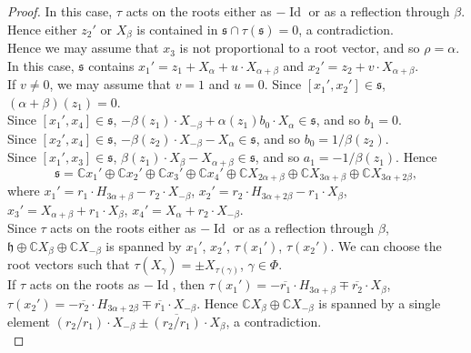 \documentclass[10pt]{article}
\begin{document}
\begin{proof}
In this case, $\tau$ acts on the roots either as $-\operatorname{Id}$ or as a reflection through $\beta$. Hence either $z_2'$ or $X_{\beta}$ is contained in $\mathfrak{s}\cap \tau (\mathfrak{s})=0$, a contradiction.\\

Hence we may assume that $x_3$ is not proportional to a root vector, and so $\rho = \alpha$. In this case, $\mathfrak{s}$ contains $x_1'=z_1+X_{\alpha}+u\cdot X_{\alpha +\beta}$ and $x_2'=z_2+v\cdot X_{\alpha +\beta}$.\\

If $v\neq 0$, we may assume that $v=1$ and $u=0$. Since $[x_1',x_2']\in \mathfrak{s}$, $(\alpha +\beta )(z_1)=0$.\\

Since $[x_1',x_4]\in \mathfrak{s}$, $-\beta (z_1)\cdot X_{-\beta}+\alpha (z_1)b_0\cdot X_{\alpha}\in \mathfrak{s}$, and so $b_1=0$.\\

Since $[x_2',x_4]\in \mathfrak{s}$, $-\beta (z_2)\cdot X_{-\beta}- X_{\alpha}\in \mathfrak{s}$, and so $b_0=1/ \beta (z_2)$.\\

Since $[x_1',x_3]\in \mathfrak{s}$, $\beta (z_1)\cdot X_{\beta}- X_{\alpha +\beta}\in \mathfrak{s}$, and so $a_1=-1/ \beta (z_1)$. Hence
$$
\mathfrak{s} = \mathbb C x_1'\oplus \mathbb C x_2'\oplus \mathbb C x_3'\oplus \mathbb C x_4'\oplus \mathbb C X_{2\alpha +\beta}\oplus \mathbb C X_{3\alpha +\beta}\oplus \mathbb C X_{3\alpha +2\beta},
$$ 
where $x_1'=r_1\cdot H_{3\alpha +\beta}-r_2\cdot X_{-\beta}$, $x_2'=r_2\cdot H_{3\alpha +2\beta}-r_1\cdot X_{\beta}$, $x_3'=X_{\alpha +\beta} +r_1\cdot X_{\beta}$, $x_4'=X_{\alpha} +r_2\cdot X_{-\beta}$.\\

Since $\tau$ acts on the roots either as $-\operatorname{Id}$ or as a reflection through $\beta$, $\mathfrak{h}\oplus \mathbb C X_{\beta}\oplus \mathbb C X_{-\beta}$ is spanned by $x_1'$, $x_2'$, $\tau (x_1')$, $\tau (x_2')$. We can choose the root vectors such that $\tau (X_{\gamma})=\pm X_{\tau (\gamma )}$, $\gamma \in \Phi$.\\

If $\tau$ acts on the roots as $-\operatorname{Id}$, then $\tau (x_1')=-\overline{r_1}\cdot H_{3\alpha +\beta}\mp \overline{r_2}\cdot X_{\beta}$, $\tau (x_2')=-\overline{r_2}\cdot H_{3\alpha +2\beta}\mp \overline{r_1}\cdot X_{-\beta}$. Hence $\mathbb C X_{\beta}\oplus \mathbb C X_{-\beta}$ is spanned by a single element $\left( r_2/r_1 \right) \cdot X_{-\beta}\pm \overline{\left( r_2/r_1 \right) } \cdot X_{\beta}$, a contradiction.\\


\end{proof}
\end{document}
